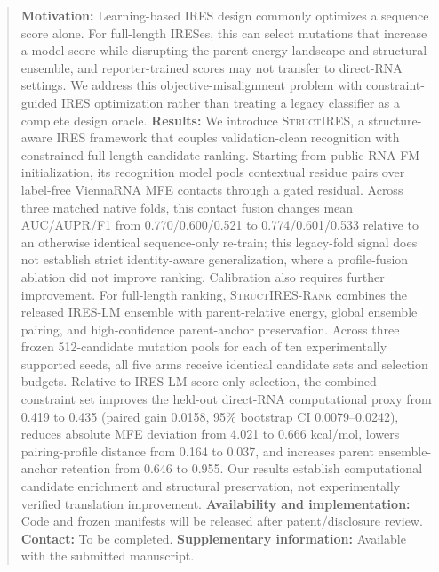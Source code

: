 \begin{abstract}
\textbf{Motivation:} Learning-based IRES design commonly optimizes a sequence score alone. For
full-length IRESes, this can select mutations that increase a model score while disrupting the
parent energy landscape and structural ensemble, and reporter-trained scores may not transfer to
direct-RNA settings. We address this objective-misalignment problem with constraint-guided IRES
optimization rather than treating a legacy classifier as a complete design oracle.
\textbf{Results:} We introduce \textsc{StructIRES}, a structure-aware IRES framework that couples
validation-clean recognition with constrained full-length candidate ranking. Starting from public
RNA-FM initialization, its recognition model pools contextual residue pairs over label-free
ViennaRNA MFE contacts through a gated residual. Across three matched native folds, this contact
fusion changes mean AUC/AUPR/F1 from 0.770/0.600/0.521 to 0.774/0.601/0.533 relative to an
otherwise identical sequence-only re-train; this legacy-fold signal does not establish strict
identity-aware generalization, where a profile-fusion ablation did not improve ranking.
Calibration also requires further improvement. For
full-length ranking, \textsc{StructIRES-Rank} combines the released IRES-LM ensemble with
parent-relative energy, global ensemble pairing, and high-confidence parent-anchor preservation.
Across three frozen 512-candidate mutation pools for each of ten experimentally supported seeds,
all five arms receive identical candidate sets and selection budgets. Relative to IRES-LM
score-only selection, the combined constraint set improves the held-out direct-RNA computational
proxy from 0.419 to 0.435 (paired gain 0.0158, 95\% bootstrap CI 0.0079--0.0242), reduces absolute
MFE deviation from 4.021 to 0.666 kcal/mol, lowers pairing-profile distance from 0.164 to 0.037,
and increases parent ensemble-anchor retention from 0.646 to 0.955. Our results establish
computational candidate enrichment and structural preservation, not experimentally verified
translation improvement.
\textbf{Availability and implementation:} Code and frozen manifests will be released after
patent/disclosure review. \textbf{Contact:} To be completed. \textbf{Supplementary information:}
Available with the submitted manuscript.
\end{abstract}
